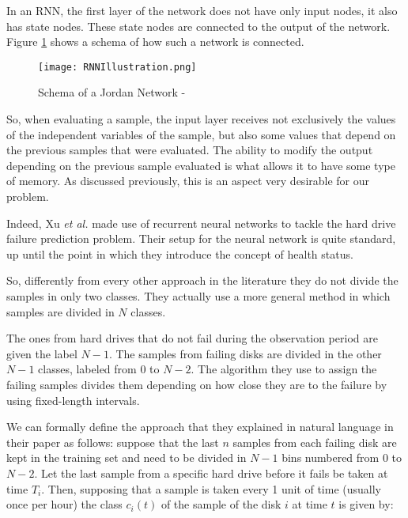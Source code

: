 In an RNN, the first layer of the network does not have only input nodes, it also has state nodes.
These state nodes are connected to the output of the network.
Figure \ref{fig:RNNIllustration} shows a schema of how such a network is connected.

\begin{figure}
    \begin{center}
        \texttt{[image: RNNIllustration.png]}
        \caption[Schema of a Jordan Network]{Schema of a Jordan Network - \cite{elman1990finding}}
        \label{fig:RNNIllustration}
    \end{center}
\end{figure}

So, when evaluating a sample, the input layer receives not exclusively the values of the independent variables of the sample, but also some values that depend on the previous samples that were evaluated.
The ability to modify the output depending on the previous sample evaluated is what allows it to have some type of memory.
As discussed previously, this is an aspect very desirable for our problem.

Indeed, Xu \textit{et al.} \cite{Xu16} made use of recurrent neural networks to tackle the hard drive failure prediction problem.
Their setup for the neural network is quite standard, up until the point in which they introduce the concept of health status.

So, differently from every other approach in the literature they do not divide the samples in only two classes.
They actually use a more general method in which samples are divided in $N$ classes.

The ones from hard drives that do not fail during the observation period are given the label $N-1$.
The samples from failing disks are divided in the other $N-1$ classes, labeled from $0$ to $N-2$.
The algorithm they use to assign the failing samples divides them depending on how close they are to the failure by using fixed-length intervals.

We can formally define the approach that they explained in natural language in their paper as follows:
suppose that the last $n$ samples from each failing disk are kept in the training set and need to be divided in $N-1$ bins numbered from 0 to $N-2$.
Let the last sample from a specific hard drive before it fails be taken at time $T_i$.
Then, supposing that a sample is taken every 1 unit of time (usually once per hour) the class $c_i(t)$ of the sample of the disk $i$ at time $t$ is given by:

